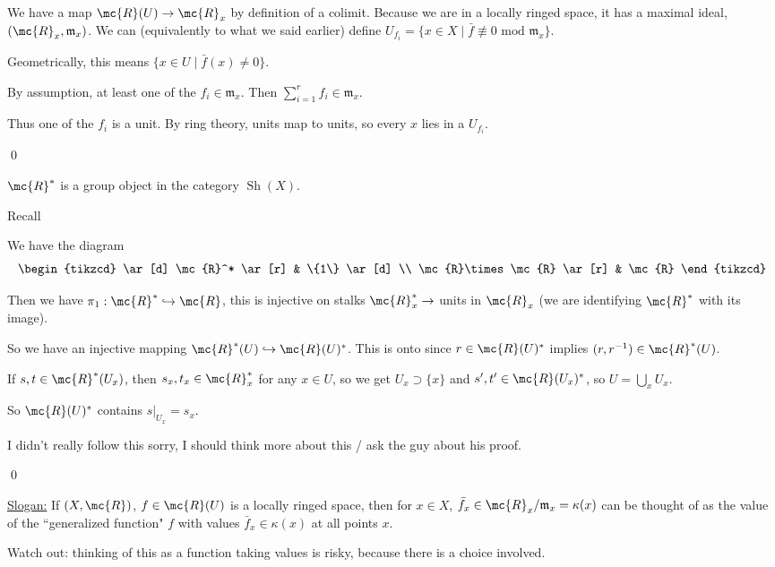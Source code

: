 \documentclass[x11names,reqno,14pt]{extarticle}
\newcommand{\mk}[1]{\mathfrak{#1}}
\DeclareMathOperator{\Sh}{Sh}
\newcommand{\into}{\hookrightarrow}
\newcommand{\barf}{\bar{f}}
\begin{document}
\proof

We have a map $\mc{R}(U) \to \mc{R}_x$ by definition of a colimit. Because we are in a locally ringed space, it has a maximal ideal, $(\mc{R}_x,\mk{m}_x)$. We can (equivalently to what we said earlier) define $U_{f_i} = \{x \in X \mid \barf\not\equiv0\text{ mod } \mk{m}_x\}$. 

Geometrically, this means $\{x\in U \mid \barf(x) \neq 0\}$. 

By assumption, at least one of the $f_i \in \mk{m}_x$. Then $\sum_{i=1}^rf_i\in\mk{m}_x$.

Thus one of the $f_i$ is a unit. By ring theory, units map to units, so every $x$ lies in a $U_{f_i}$. 

\qed

\claim 

$\mc{R}^*$ is a group object in the category $\Sh(X)$. 

\proof

Recall

We have the diagram 
\[
\begin{tikzcd}
\ar[d] \mc{R}^* \ar[r] & \{1\} \ar[d] \\
\mc{R}\times\mc{R} \ar[r] & \mc{R}
\end{tikzcd}
\]

Then we have $\pi_1:\mc{R}^*\into \mc{R}$, this is injective on stalks $\mc{R}_x^* \to$ units in $\mc{R}_x$ (we are identifying $\mc{R}^*$ with its image). 

So we have an injective mapping $\mc{R}^*(U) \into \mc{R}(U)^*$. This is onto since $r \in \mc{R}(U)^*$ implies $(r, r^{-1}) \in \mc{R}^*(U)$. 

If $s, t \in \mc{R}^*(U_x)$, then $s_x, t_x \in \mc{R}^*_x$ for any $x \in U$, so we get $U_x \supset \{x\}$ and $s', t' \in \mc{R}(U_x)^*$, so $U = \bigcup_{x}U_x$. 

So $\mc{R}(U)^*$ contains $s|_{U_x} = s_x$. 

I didn't really follow this sorry, I should think more about this / ask the guy about his proof. 

\qed

\underline{Slogan:} If $(X,\mc{R})$, $f \in \mc{R}(U)$ is a locally ringed space, then for $x \in X$, $\barf_x \in \mc{R}_x/\mk{m}_x = \kappa(x)$ can be thought of as the value of the ``generalized function" $f$ with values $\barf_x \in \kappa(x)$ at all points $x$. 

Watch out: thinking of this as a function taking values is risky, because there is a choice involved. 
\end{document}
